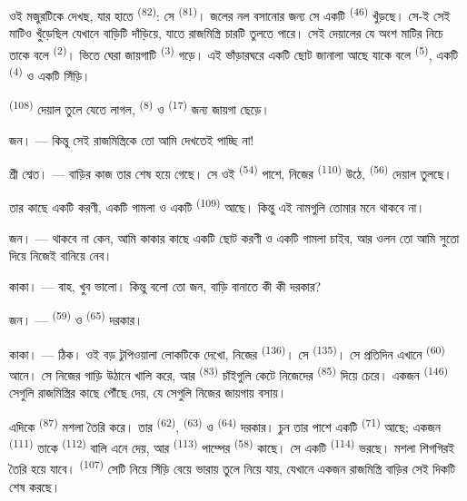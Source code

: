 ওই মজুরটিকে দেখছ, যার হাতে  \textsuperscript{(82)}: সে
 \textsuperscript{(81)}। জলের নল বসানোর জন্য সে একটি
 \textsuperscript{(46)} খুঁড়ছে। সে-ই সেই মাটিও খুঁড়েছিল যেখানে
বাড়িটি দাঁড়িয়ে, যাতে রাজমিস্ত্রি চারটি  তুলতে পারে। সেই
দেয়ালের যে অংশ মাটির নিচে তাকে বলে  \textsuperscript{(2)}। ভিতে
ঘেরা জায়গাটি  \textsuperscript{(3)} গড়ে। এই ভাঁড়ারঘরে একটি
ছোট জানালা আছে যাকে বলে  \textsuperscript{(5)}, একটি
 \textsuperscript{(4)} ও একটি সিঁড়ি।

 \textsuperscript{(108)} দেয়াল তুলে যেতে লাগল,
 \textsuperscript{(8)} ও  \textsuperscript{(17)}
জন্য জায়গা ছেড়ে।

\textsc{জন}। --- কিন্তু সেই রাজমিস্ত্রিকে তো আমি দেখতেই পাচ্ছি না!

\textsc{শ্রী শ্বেত}। --- বাড়ির কাজ তার শেষ হয়ে গেছে। সে ওই
 \textsuperscript{(54)} পাশে, নিজের 
\textsuperscript{(110)} উঠে,  \textsuperscript{(56)} দেয়াল
তুলছে।

তার কাছে একটি করণী, একটি গামলা ও একটি  \textsuperscript{(109)}
আছে। কিন্তু এই নামগুলি তোমার মনে থাকবে না।

\textsc{জন}। --- থাকবে না কেন, আমি কাকার কাছে একটি ছোট করণী ও একটি গামলা
চাইব, আর ওলন তো আমি সুতো দিয়ে নিজেই বানিয়ে নেব।

\VUsaut{3.0mm}
\VUsaut{3.0mm}

\textsc{কাকা}। --- বাহ, খুব ভালো। কিন্তু বলো তো জন, বাড়ি বানাতে কী কী দরকার?

\textsc{জন}। ---  \textsuperscript{(59)} ও 
\textsuperscript{(65)} দরকার।

\textsc{কাকা}। --- ঠিক। ওই বড় টুপিওয়ালা লোকটিকে দেখো, নিজের 
\textsuperscript{(136)}। সে  \textsuperscript{(135)}। সে প্রতিদিন
এখানে  \textsuperscript{(60)} আনে। সে নিজের গাড়ি উঠানে
খালি করে, আর  \textsuperscript{(83)} চাঁইগুলি কেটে নিজেদের
 \textsuperscript{(85)} দিয়ে চেরে। একজন 
\textsuperscript{(146)} সেগুলি রাজমিস্ত্রির কাছে পৌঁছে দেয়, যে সেগুলি নিজের
জায়গায় বসায়।

এদিকে  \textsuperscript{(87)} মশলা তৈরি করে। তার
 \textsuperscript{(62)},  \textsuperscript{(63)} ও
 \textsuperscript{(64)} দরকার। চুন তার পাশে একটি 
\textsuperscript{(71)} আছে; একজন  \textsuperscript{(111)} তাকে
 \textsuperscript{(112)} বালি এনে দেয়, আর
 \textsuperscript{(113)} পাম্পের \textsuperscript{(58)} কাছে।
সে একটি  \textsuperscript{(114)} ভরছে। মশলা শিগগিরই তৈরি হয়ে
যাবে।  \textsuperscript{(107)} সেটি নিয়ে সিঁড়ি বেয়ে ভারায়
তুলে নিয়ে যায়, যেখানে একজন রাজমিস্ত্রি বাড়ির সেই দিকটি শেষ করছে।

